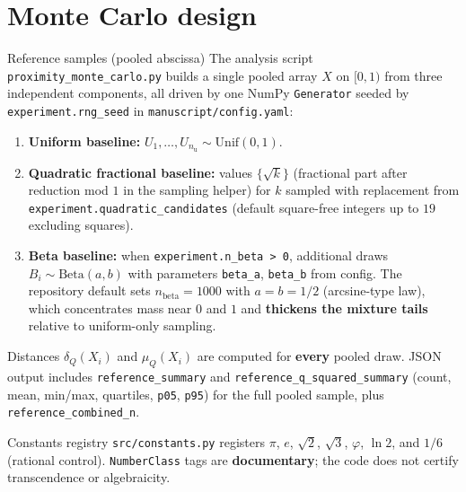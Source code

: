 \documentclass[
  ignorenonframetext,
]{beamer}
\author{\texorpdfstring{}{}}
\date{}
\providecommand{\tightlist}{%
  \setlength{\itemsep}{0pt}\setlength{\parskip}{0pt}}
\begin{document}
\section{Monte Carlo design}\label{monte-carlo-design}

\begin{frame}[fragile]{Reference samples (pooled abscissa)}
\protect{}\label{reference-samples-pooled-abscissa}
The analysis script \texttt{proximity\_monte\_carlo.py} builds a single
pooled array \(X\) on \([0,1)\) from three independent components, all
driven by one NumPy \texttt{Generator} seeded by
\texttt{experiment.rng\_seed} in \texttt{manuscript/config.yaml}:

\begin{enumerate}
\tightlist
\item
  \textbf{Uniform baseline:}
  \(U_1,\ldots,U_{n_{\mathrm{u}}} \sim \mathrm{Unif}(0,1)\).
\item
  \textbf{Quadratic fractional baseline:} values \(\{\sqrt{k}\}\)
  (fractional part after reduction mod \(1\) in the sampling helper) for
  \(k\) sampled with replacement from
  \texttt{experiment.quadratic\_candidates} (default square-free
  integers up to \(19\) excluding squares).
\item
  \textbf{Beta baseline:} when
  \texttt{experiment.n\_beta\ \textgreater{}\ 0}, additional draws
  \(B_i \sim \mathrm{Beta}(a,b)\) with parameters \texttt{beta\_a},
  \texttt{beta\_b} from config. The repository default sets
  \(n_{\mathrm{beta}}=1000\) with \(a=b=1/2\) (arcsine-type law), which
  concentrates mass near \(0\) and \(1\) and \textbf{thickens the
  mixture tails} relative to uniform-only sampling.
\end{enumerate}

Distances \(\delta_Q(X_i)\) and \(\mu_Q(X_i)\) are computed for
\textbf{every} pooled draw. JSON output includes
\texttt{reference\_summary} and \texttt{reference\_q\_squared\_summary}
(count, mean, min/max, quartiles, \texttt{p05}, \texttt{p95}) for the
full pooled sample, plus \texttt{reference\_combined\_n}.
\end{frame}

\begin{frame}[fragile]{Constants registry}
\protect{}\label{constants-registry}
\texttt{src/constants.py} registers \(\pi\), \(e\), \(\sqrt{2}\),
\(\sqrt{3}\), \(\varphi\), \(\ln 2\), and \(1/6\) (rational control).
\texttt{NumberClass} tags are \textbf{documentary}; the code does not
certify transcendence or algebraicity.
\end{frame}
\end{document}
